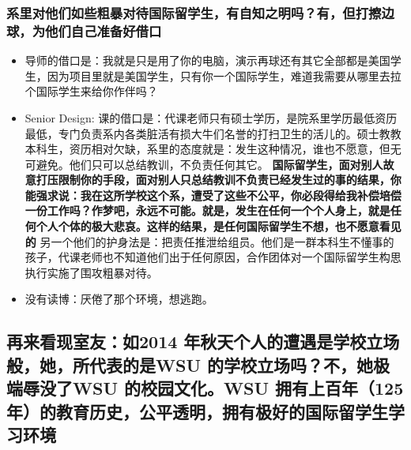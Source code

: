 \documentclass[9pt, b5paper]{article}
\begin{document}
\subsubsection{系里对他们如些粗暴对待国际留学生，有自知之明吗？有，但打擦边球，为他们自己准备好借口}
\label{sec-3-1-3}
\begin{itemize}
\item 导师的借口是：我就是只是用了你的电脑，演示再球还有其它全部都是美国学生，因为项目里就是美国学生，只有你一个国际学生，难道我需要从哪里去拉个国际学生来给你作伴吗？
\item Senior Design: 课的借口是：代课老师只有硕士学历，是院系里学历最低资历最低，专门负责系内各类脏活有损大牛们名誉的打扫卫生的活儿的。硕士教教本科生，资历相对欠缺，系里的态度就是：发生这种情况，谁也不愿意，但无可避免。他们只可以总结教训，不负责任何其它。 \textbf{国际留学生，面对别人故意打压限制你的手段，面对别人只总结教训不负责已经发生过的事的结果，你能强求说：我在这所学校这个系，遭受了这些不公平，你必段得给我补偿培偿一份工作吗？作梦吧，永远不可能。就是，发生在任何一个个人身上，就是任何个人个体的极大悲哀。这样的结果，是任何国际留学生不想，也不愿意看见的} 另一个他们的护身法是：把责任推泄给组员。他们是一群本科生不懂事的孩子，代课老师也不知道他们出于任何原因，合作团体对一个国际留学生构思执行实施了围攻粗暴对待。
\item 没有读博：厌倦了那个环境，想逃跑。
\end{itemize}
\subsection{再来看现室友：如2014 年秋天个人的遭遇是学校立场般，她，所代表的是WSU 的学校立场吗？不，她极端辱没了WSU 的校园文化。WSU 拥有上百年（125 年）的教育历史，公平透明，拥有极好的国际留学生学习环境}
\label{sec-3-2}
\end{document}

